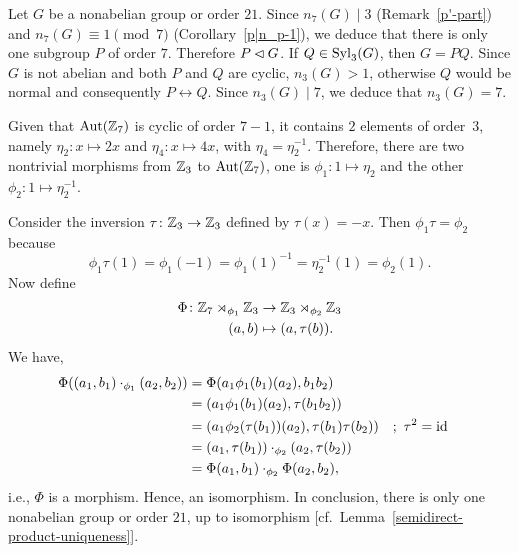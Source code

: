 \begin{xmpl}\label{example:group-of-order-21}
    Let $G$ be a nonabelian group or order $21$. Since $n_7(G)\mid3$ (Remark~\ref{p'-part}) and $n_7(G)\equiv 1\pmod 7$ (Corollary~\ref{p|n_p-1}), we deduce that there is only one subgroup $P$ of order $7$. Therefore $P\lhd G$. If $Q\in{\rm Syl}_3(G)$, then $G=PQ$. Since $G$ is not abelian and both $P$ and $Q$ are cyclic, $n_3(G)>1$, otherwise $Q$ would be normal and consequently $P\leftrightarrow Q$. Since $n_3(G)\mid 7$, we deduce that $n_3(G)=7$.

    Given that ${\rm Aut}(\mathbb{Z}_7)$ is cyclic of order $7-1$, it contains $2$ elements of order~$3$, namely $\eta_2\colon x\mapsto 2x$ and $\eta_4\colon x\mapsto4x$, with $\eta_4=\eta_2^{-1}$. Therefore, there are two nontrivial morphisms from $\mathbb{Z}_3$ to ${\rm Aut}(\mathbb{Z}_7)$, one is $\phi_1\colon1\mapsto\eta_2$ and the other $\phi_2\colon 1\mapsto\eta_2^{-1}$.

    Consider the inversion $\tau\colon\mathbb{Z}_3\to\mathbb{Z}_3$ defined by $\tau(x)=-x$. Then $\phi_1\tau=\phi_2$ because
    $$
        \phi_1\tau(1)=\phi_1(-1)=\phi_1(1)^{-1}=\eta_2^{-1}(1)=\phi_2(1).
    $$
    Now define
    \begin{align*}
        \Phi\colon\mathbb{Z}_7\rtimes_{\phi_1}\mathbb{Z}_3&\to\mathbb{Z}_3\rtimes_{\phi_2}\mathbb{Z}_3\\
            (a,b)&\mapsto(a,\tau(b)).
    \end{align*}
    We have,
    \begin{align*}
        \Phi((a_1,b_1)\cdot_{\phi_1}(a_2,b_2))
            &= \Phi(a_1\phi_1(b_1)(a_2),b_1b_2)\\
            &= (a_1\phi_1(b_1)(a_2),\tau(b_1b_2))\\
            &= (a_1\phi_2(\tau(b_1))(a_2),\tau(b_1)\tau(b_2))
                &&;\ \tau^2=\operatorname{id}\\
            &= (a_1,\tau(b_1))\cdot_{\phi_2}(a_2,\tau(b_2))\\
            &= \Phi(a_1,b_1)\cdot_{\phi_2}\Phi(a_2,b_2),
    \end{align*}
    i.e., $\Phi$ is a morphism. Hence, an isomorphism. In conclusion, there is only one nonabelian group or order $21$, up to isomorphism [cf.~Lemma~\ref{semidirect-product-uniqueness}].


\end{xmpl}
